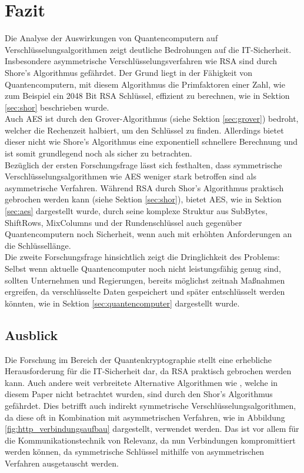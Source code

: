 \section{Fazit}
Die Analyse der Auswirkungen von Quantencomputern auf Verschlüsselungsalgorithmen
zeigt deutliche Bedrohungen auf die IT-Sicherheit. Insbesondere asymmetrische 
Verschlüsselungsverfahren wie RSA sind durch Shore's Algorithmus gefährdet. 
Der Grund liegt in der Fähigkeit von Quantencomputern, mit diesem Algorithmus
die Primfaktoren einer Zahl, wie zum Beispiel ein 2048 Bit RSA Schlüssel, 
effizient zu berechnen, wie in Sektion \ref{sec:shor} beschrieben wurde.\\
Auch AES ist durch den Grover-Algorithmus (siehe Sektion \ref{sec:grover}) bedroht, welcher die Rechenzeit 
halbiert, um den Schlüssel zu finden. Allerdings bietet dieser 
nicht wie Shore's Algorithmus eine exponentiell schnellere Berechnung und ist somit
grundlegend noch als sicher zu betrachten.\\
Bezüglich der ersten Forschungsfrage lässt sich festhalten, dass symmetrische 
Verschlüsselungsalgorithmen wie AES weniger stark betroffen sind als 
asymmetrische Verfahren. Während RSA durch Shor's Algorithmus praktisch 
gebrochen werden kann (siehe Sektion \ref{sec:shor}), bietet AES,
wie in Sektion \ref{sec:aes} dargestellt wurde, durch seine komplexe Struktur aus SubBytes, 
ShiftRows, MixColumns und der Rundenschlüssel auch gegenüber Quantencomputern 
noch Sicherheit, wenn auch mit erhöhten Anforderungen an die Schlüssellänge.\\
Die zweite Forschungsfrage hinsichtlich 
zeigt die Dringlichkeit des Problems: Selbst wenn 
aktuelle Quantencomputer noch nicht leistungsfähig 
genug sind, sollten Unternehmen und Regierungen, bereits möglichst zeitnah 
Maßnahmen ergreifen, da verschlüsselte Daten gespeichert 
und später entschlüsselt werden könnten, wie in Sektion 
\ref{sec:quantencomputer} dargestellt wurde.\\

\subsection{Ausblick}
Die Forschung im Bereich der Quantenkryptographie stellt eine erhebliche 
Herausforderung für die IT-Sicherheit dar, da RSA praktisch gebrochen werden 
kann. Auch andere weit verbreitete Alternative Algorithmen wie ,
welche in diesem Paper nicht betrachtet wurden,
sind durch den Shor's Algorithmus gefährdet. Dies betrifft auch indirekt symmetrische
Verschlüsselungsalgorithmen, da diese oft in Kombination 
mit asymmetrischen Verfahren, wie in Abbildung \ref{fig:http_verbindungsaufbau} dargestellt, 
verwendet werden. Das ist vor allem für die Kommunikationstechnik von Relevanz, da nun
Verbindungen kompromittiert werden können, da symmetrische Schlüssel mithilfe
von asymmetrischen Verfahren ausgetauscht werden.\\


